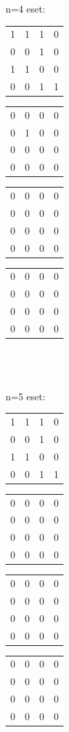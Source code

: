 \documentclass[paper=a4, fontsize=11pt]{article}
\begin{document}
n=4 eset:
\begin{tabular}{cccc}
1&1&1&0\\
0&0&1&0\\
1&1&0&0\\
0&0&1&1
\end{tabular}
\quad
\begin{tabular}{cccc}
0&0&0&0\\
0&1&0&0\\
0&0&0&0\\
0&0&0&0
\end{tabular}
\quad
\begin{tabular}{cccc}
0&0&0&0\\
0&0&0&0\\
0&0&0&0\\
0&0&0&0
\end{tabular}
\quad
\begin{tabular}{cccc}
0&0&0&0\\
0&0&0&0\\
0&0&0&0\\
0&0&0&0
\end{tabular}
\\
\\
\\
n=5 eset:
\begin{tabular}{cccc}
1&1&1&0\\
0&0&1&0\\
1&1&0&0\\
0&0&1&1
\end{tabular}
\quad
\begin{tabular}{cccc}
0&0&0&0\\
0&0&0&0\\
0&0&0&0\\
0&0&0&0
\end{tabular}
\quad
\begin{tabular}{cccc}
0&0&0&0\\
0&0&0&0\\
0&0&0&0\\
0&0&0&0
\end{tabular}
\quad
\begin{tabular}{cccc}
0&0&0&0\\
0&0&0&0\\
0&0&0&0\\
0&0&0&0
\end{tabular}








\newpage
\end{document}
